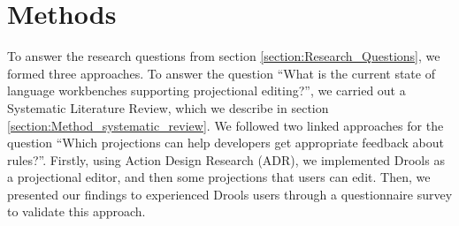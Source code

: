 \chapter{Methods}
\label{chapter:Methods}

To answer the research questions from section \ref{section:Research_Questions}, we formed three approaches.
To answer the question ``What is the current state of language workbenches supporting projectional editing?'', we carried out a Systematic Literature Review, which we describe in section \ref{section:Method_systematic_review}.
We followed two linked approaches for the question ``Which projections can help developers get appropriate feedback about rules?''.
Firstly, using Action Design Research (ADR), we implemented Drools as a projectional editor, and then some projections that users can edit.
Then, we presented our findings to experienced Drools users through a questionnaire survey to validate this approach.


\newpage

\newpage
